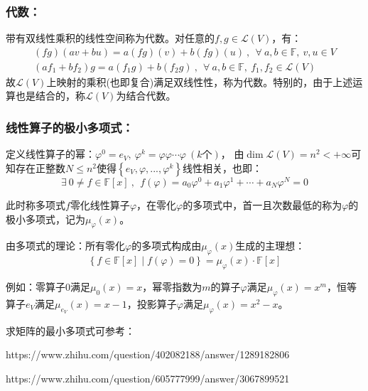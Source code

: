 \documentclass[zihao=5,UTF8]{report}
\theoremstyle{mystyle} %
\begin{document}
\subsubsection{代数：}
带有双线性乘积的线性空间称为代数。对任意的$ f,g \in \mathscr{L}(V)$，有：
\begin{gather*}
    (fg)(av + bu) = a(fg)(v) + b(fg)(u)\ ,\ \  \forall\  a,b \in \mathbb{F},\ v,u \in V\\
    (af_1 + bf_2)g = a(f_1g) + b(f_2g)\ ,\ \  \forall\  a,b \in \mathbb{F},\ f_1,f_2 \in  \mathscr{L}(V)
\end{gather*}
故$\mathscr{L}(V)$上映射的乘积(也即复合)满足双线性性，称为代数。特别的，由于上述运算也是结合的，称$\mathscr{L}(V)$为结合代数。

\subsubsection{线性算子的极小多项式：}
定义线性算子的幂：$\varphi^0 = e_V,\ \varphi^k = \varphi \varphi\cdots \varphi\ (k\text{个})$，
由$\dim \mathscr{L}(V) = n^2 < +\infty$可知存在正整数$N \le n^2 $使得$\left\{e_V, \varphi, ..., \varphi^k\right\}$线性相关，也即：
\begin{equation*}
    \exists\  0 \ne f\in \mathbb{F}[x]\ ,\  \ f(\varphi) = a_0\varphi^0 + a_1\varphi^1 + \cdots + a_N\varphi^N = 0
\end{equation*}\par
此时称多项式$f$零化线性算子$\varphi$，在零化$\varphi$的多项式中，首一且次数最低的称为$\varphi$的极小多项式，记为$\mu _{\varphi}(x)$。\par
由多项式的理论：所有零化$\varphi$的多项式构成由$\mu_{\varphi}(x)$生成的主理想：
\begin{equation*}
    \left\{f \in \mathbb{F}[x] \mid f(\varphi) = 0\right\} =\mu_{\varphi}(x) \cdot  \mathbb{F}[x]
\end{equation*}
\par
{\color{gray}\small 例如：零算子0满足$\mu_{\text{0}}(x) = x $，幂零指数为$m$的算子$\varphi$满足$\mu_{\varphi}(x) = x^m $，恒等算子$e_V$满足$\mu_{e_V}(x) = x-1$，投影算子$\varphi$满足$\mu_{\varphi}(x) = x^2 -x$。\par
求矩阵的最小多项式可参考：\par
https://www.zhihu.com/question/402082188/answer/1289182806 \par
https://www.zhihu.com/question/605777999/answer/3067899521
}
\end{document}
